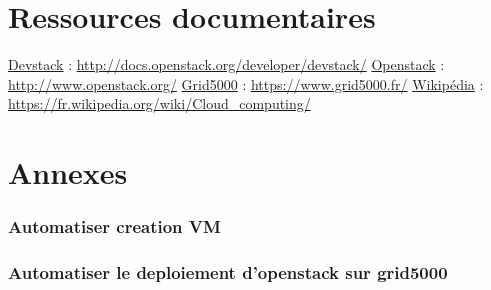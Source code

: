 \documentclass{report}
\begin{document}
\chapter*{Ressources documentaires}
\href{}{Devstack} :
\url{http://docs.openstack.org/developer/devstack/}
\bigbreak
\href{}{Openstack} :
\url{http://www.openstack.org/}
\bigbreak
\href{}{Grid5000} :
\url{https://www.grid5000.fr/}
\bigbreak
\href{}{Wikipédia} :
\url{https://fr.wikipedia.org/wiki/Cloud_computing/}


\newpage
\chapter*{Annexes}
 
            
            
        \subsection{Automatiser creation VM}
            
        \subsection{Automatiser le deploiement d'openstack sur grid5000}
            
            
            
            
            
\end{document}
